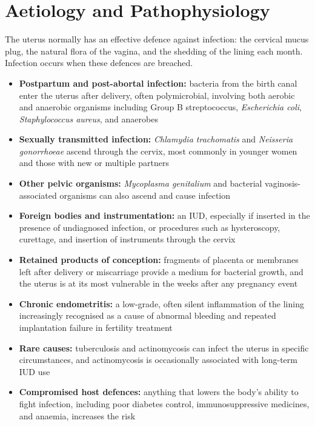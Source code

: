 \section*{Aetiology and Pathophysiology}
The uterus normally has an effective defence against infection: the cervical mucus plug, the natural flora of the vagina, and the shedding of the lining each month. Infection occurs when these defences are breached.

\begin{itemize}
    \item \textbf{Postpartum and post-abortal infection:} bacteria from the birth canal enter the uterus after delivery, often polymicrobial, involving both aerobic and anaerobic organisms including Group B streptococcus, \textit{Escherichia coli}, \textit{Staphylococcus aureus}, and anaerobes
    \item \textbf{Sexually transmitted infection:} \textit{Chlamydia trachomatis} and \textit{Neisseria gonorrhoeae} ascend through the cervix, most commonly in younger women and those with new or multiple partners
    \item \textbf{Other pelvic organisms:} \textit{Mycoplasma genitalium} and bacterial vaginosis-associated organisms can also ascend and cause infection
    \item \textbf{Foreign bodies and instrumentation:} an IUD, especially if inserted in the presence of undiagnosed infection, or procedures such as hysteroscopy, curettage, and insertion of instruments through the cervix
    \item \textbf{Retained products of conception:} fragments of placenta or membranes left after delivery or miscarriage provide a medium for bacterial growth, and the uterus is at its most vulnerable in the weeks after any pregnancy event
    \item \textbf{Chronic endometritis:} a low-grade, often silent inflammation of the lining increasingly recognised as a cause of abnormal bleeding and repeated implantation failure in fertility treatment
    \item \textbf{Rare causes:} tuberculosis and actinomycosis can infect the uterus in specific circumstances, and actinomycosis is occasionally associated with long-term IUD use
    \item \textbf{Compromised host defences:} anything that lowers the body's ability to fight infection, including poor diabetes control, immunosuppressive medicines, and anaemia, increases the risk
\end{itemize}

